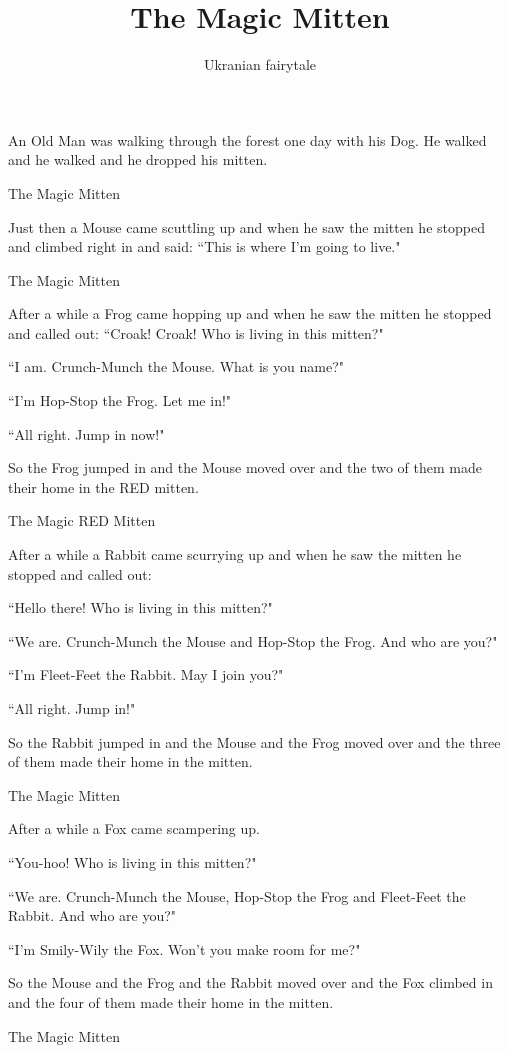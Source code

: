 \documentclass{article}
\title{The Magic Mitten}
\author{Ukranian fairytale}
\begin{document}
\maketitle

An Old Man was walking through the forest one day with his Dog. He walked and he walked and he dropped his mitten.

The Magic Mitten

Just then a Mouse came scuttling up and when he saw the mitten he stopped and climbed right in and said: ``This is where I'm going to live."

The Magic Mitten

After a while a Frog came hopping up and when he saw the mitten he stopped and called out:
``Croak! Croak! Who is living in this mitten?"

``I am. Crunch-Munch the Mouse. What is you name?"

``I'm Hop-Stop the Frog. Let me in!"

``All right. Jump in now!"

So the Frog jumped in and the Mouse moved over and the two of them made their home in the RED mitten.

The Magic RED Mitten

After a while a Rabbit came scurrying up and when he saw the mitten he stopped and called out:

``Hello there! Who is living in this mitten?"

``We are. Crunch-Munch the Mouse and Hop-Stop the Frog. And who are you?"

``I'm Fleet-Feet the Rabbit. May I join you?"

``All right. Jump in!"

So the Rabbit jumped in and the Mouse and the Frog moved over and the three of them made their home in the mitten.

The Magic Mitten

After a while a Fox came scampering up.

``You-hoo! Who is living in this mitten?"

``We are. Crunch-Munch the Mouse, Hop-Stop the Frog and Fleet-Feet the Rabbit. And who are you?"

``I'm Smily-Wily the Fox. Won't you make room for me?"

So the Mouse and the Frog and the Rabbit moved over and the Fox climbed in and the four of them made their home in the mitten.

The Magic Mitten
\end{document}
